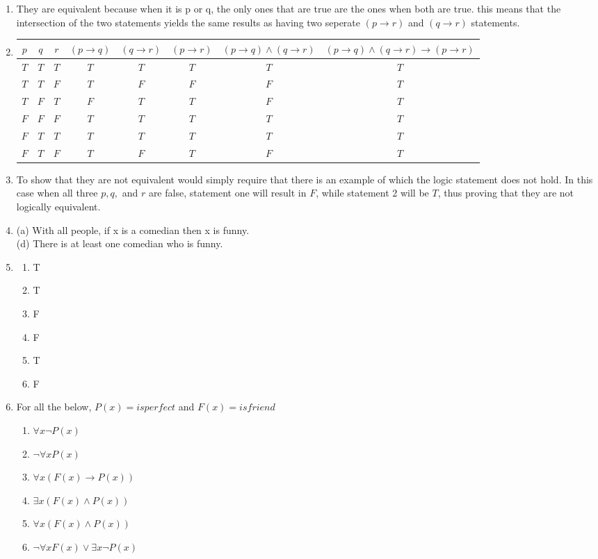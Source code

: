 \documentclass{article}
\begin{document}
\begin{enumerate}
\item They are equivalent because when it is p or q, the only ones that are true are the ones when both are true.  this means that the intersection of the two statements yields the same results as having two seperate $(p \rightarrow r)$ and $(q \rightarrow r)$ statements.  

\item 
 \begin{tabular}{|c|c|c|c|c|c|c|c|}
  \hline
  $p$ & $q$ & $r$ & $(p \rightarrow q)$ & $(q \rightarrow r)$ & $(p \rightarrow r)$ & $(p \rightarrow q) \land (q \rightarrow r)$ & $(p \rightarrow q) \land (q \rightarrow r) \rightarrow (p \rightarrow r)$ \\ \hline
  $T$ & $T$ & $T$ & $T$ & $T$ & $T$ & $T$ & $T$ \\ \hline
  $T$ & $T$ & $F$ & $T$ & $F$ & $F$ & $F$ & $T$ \\ \hline
  $T$ & $F$ & $T$ & $F$ & $T$ & $T$ & $F$ & $T$ \\ \hline
  $F$ & $F$ & $F$ & $T$ & $T$ & $T$ & $T$ & $T$ \\ \hline
  $F$ & $T$ & $T$ & $T$ & $T$ & $T$ & $T$ & $T$ \\ \hline
  $F$ & $T$ & $F$ & $T$ & $F$ & $T$ & $F$ & $T$ \\ \hline
 \end{tabular}

\item To show that they are not equivalent would simply require that there is an example of which the logic statement does not hold. In this case when all three $p, q, $ and $r$ are false, statement one will result in $F$, while statement 2 will be $T$, thus proving that they are not logically equivalent.

\item 
	(a) With all people, if x is a comedian then x is funny. \\
	(d) There is at least one comedian who is funny.

\item
 \begin{enumerate}
	\item T
	\item T
	\item F
	\item F
	\item T
	\item F
 \end{enumerate}

\item For all the below, $P(x)= is perfect$ and $F(x)= is friend$ \\
 \begin{enumerate}
  \item $\forall x \neg P(x)$
  \item $\neg \forall x P(x)$
  \item $\forall x(F(x) \rightarrow P(x))$
  \item $\exists x(F(x) \land P(x))$
  \item $\forall x(F(x) \land P(x))$
  \item $\neg \forall xF(x) \lor \exists x \neg P(x)$ 
 \end{enumerate}


\end{enumerate}
\end{document}

